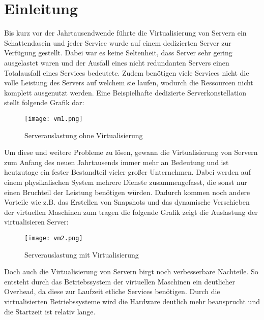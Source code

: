 \section{Einleitung}
\label{sec:Einleitung}

Bis kurz vor der Jahrtausendwende führte die Virtualisierung von Servern ein Schattendasein und jeder Service wurde auf einem dedizierten Server zur Verfügung gestellt. Dabei war es keine Seltenheit, dass Server sehr gering ausgelastet waren und der Ausfall eines nicht redundanten Servers einen Totalausfall eines Services bedeutete. Zudem benötigen viele Services nicht die volle Leistung des Servers auf welchem sie laufen, wodurch die Ressourcen nicht komplett ausgenutzt werden. Eine Beispielhafte dedizierte Serverkonstellation stellt folgende Grafik dar:
\begin{figure}[H]
	\begin{center}
		\texttt{[image: vm1.png]}
	\end{center}
	\caption[Serverauslastung ohne Virtualisierung]{Serverauslastung ohne Virtualisierung \footnotemark}
	\label{fig:HW1}
\end{figure}
\newpage
Um diese und weitere Probleme zu lösen, gewann die Virtualisierung von Servern zum Anfang des neuen Jahrtausends immer mehr an Bedeutung und ist heutzutage ein fester Bestandteil vieler großer Unternehmen. Dabei werden auf einem physikalischen System mehrere Dienste zusammengefasst, die sonst nur einen Bruchteil der Leistung benötigen würden. Dadurch kommen noch andere Vorteile wie z.B. das Erstellen von Snapshots und das dynamische Verschieben der virtuellen Maschinen zum tragen die folgende Grafik zeigt die Auslastung der virtualisieren Server:
\begin{figure}[H]
	\begin{center}
		\texttt{[image: vm2.png]}
	\end{center}
	\caption[Serverauslastung mit Virtualisierung]{Serverauslastung mit Virtualisierung \footnotemark}
	\label{fig:HW2}
\end{figure}
\newpage
Doch auch die Virtualisierung von Servern birgt noch verbesserbare Nachteile. So entsteht durch das Betriebssystem der virtuellen Maschinen ein deutlicher Overhead, da diese zur Laufzeit etliche Services benötigen. Durch die virtualisierten Betriebssysteme wird die Hardware deutlich mehr beansprucht und die Startzeit ist relativ lange.
